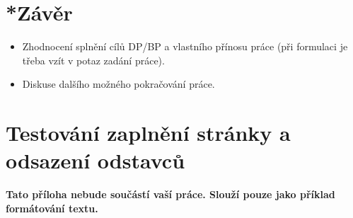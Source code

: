 \documentclass[11pt,twoside,a4paper]{book}
\begin{document}
\chapter{*Závěr}

\begin{itemize}
\item Zhodnocení splnění cílů DP/BP a  vlastního přínosu práce (při formulaci je třeba vzít v potaz zadání práce).
\item Diskuse dalšího možného pokračování práce.
\end{itemize} 


%




%
{

}

%

\appendix

\chapter{Testování zaplnění stránky a odsazení odstavců}
\textbf{\large Tato příloha nebude součástí vaší práce. 
Slouží pouze jako příklad formátování textu.}
\end{document}
